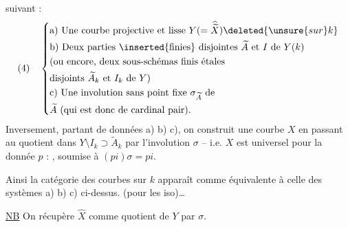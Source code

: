 suivant :
\[
(4)\quad\left\{\begin{aligned}
&\text{a) Une courbe projective et lisse }Y(=\widehat{\widetilde X})\deleted{\unsure{sur }k}\\
&\text{b) Deux parties }\inserted{\text{finies}}\text{ disjointes }\widetilde A\text{ et }I\text{ de }Y(k)\\
&\text{(ou encore, deux sous-schémas finis étales}\\
&\text{disjoints }\widetilde A_k\text{ et }I_k\text{ de }Y\text{)}\\
&\text{c) Une involution sans point fixe }\sigma_{\widetilde A}\text{ de}\\
&\widetilde A\text{ (qui est donc de cardinal pair).}
\end{aligned}\right.
\]
Inversement, partant de données a) b) c), on construit une courbe  $X$ en passant au quotient dans $Y\setminus I_k\supset\widetilde A_k$ par l'involution $\sigma$ -- i.e. $X$ est universel  pour la donnée $p$ :
, soumise à $(pi)\sigma=pi$.

Ainsi la catégorie des courbes  sur $k$  apparaît comme équivalente à celle des systèmes a) b) c) ci-dessus. (pour les iso)\ldots

\uline{NB} On récupère $\widehat X$ comme quotient de $Y$ par $\sigma$.

